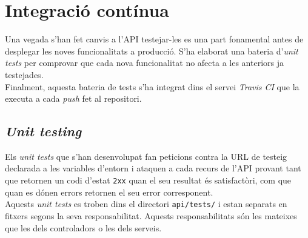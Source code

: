\section{Integració contínua}

Una vegada s'han fet canvis a l'\ac{API} testejar-les es una part fonamental antes de desplegar les noves funcionalitats a producció. S'ha elaborat una bateria d'\emph{unit tests} per comprovar que cada nova funcionalitat no afecta a les anteriors ja testejades.\\

Finalment, aquesta bateria de tests s'ha integrat dins el servei \emph{Travis CI} que la executa a cada \emph{push} fet al repositori.

\subsection{\emph{Unit testing}}

Els \emph{unit tests} que s'han desenvolupat fan peticions contra la \ac{URL} de testeig declarada a les variables d'entorn i ataquen a cada recurs de l'\ac{API} provant tant que retornen un codi d'estat \texttt{2xx} quan el seu resultat és satisfactòri, com que quan es dónen errors retornen el seu error corresponent.\\

Aquests \emph{unit tests} es troben dins el directori \texttt{api/tests/} i estan separats en fitxers segons la seva responsabilitat. Aquests responsabilitats són les mateixes que les dels controladors o les dels serveis. 
